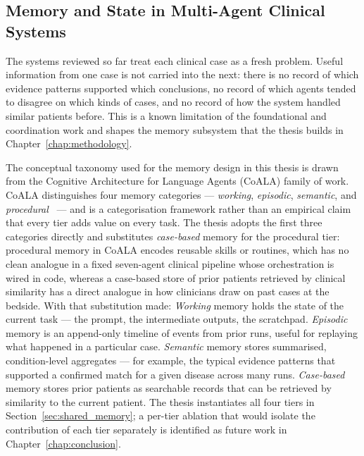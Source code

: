 \FloatBarrier
\subsection{Memory and State in Multi-Agent Clinical Systems}
\label{subsec:memory_state}

The systems reviewed so far treat each clinical case as a fresh problem.
Useful information from one case is not carried into the next: there is no
record of which evidence patterns supported which conclusions, no record of
which agents tended to disagree on which kinds of cases, and no record of how
the system handled similar patients before. This is a known limitation of the
foundational and coordination work and shapes the memory subsystem that the
thesis builds in Chapter~\ref{chap:methodology}.

The conceptual taxonomy used for the memory design in this thesis is drawn
from the Cognitive Architecture for Language Agents (CoALA) family of work.
CoALA distinguishes four memory categories --- \emph{working}, \emph{episodic},
\emph{semantic}, and \emph{procedural}~\cite{Sumers2024CoALA} --- and is a
categorisation framework rather than an empirical claim that every tier
adds value on every task. The thesis adopts the first three categories
directly and substitutes \emph{case-based} memory for the procedural tier:
procedural memory in CoALA encodes reusable skills or routines, which has no
clean analogue in a fixed seven-agent clinical pipeline whose orchestration
is wired in code, whereas a case-based store of prior patients retrieved by
clinical similarity has a direct analogue in how clinicians draw on past
cases at the bedside. With that substitution made: \emph{Working} memory
holds the state of the current task --- the prompt, the intermediate
outputs, the scratchpad. \emph{Episodic} memory is an append-only timeline
of events from prior runs, useful for replaying what happened in a
particular case. \emph{Semantic} memory stores summarised, condition-level
aggregates --- for example, the typical evidence patterns that supported a
confirmed match for a given disease across many runs. \emph{Case-based}
memory stores prior patients as searchable records that can be retrieved by
similarity to the current patient. The thesis instantiates all four tiers in
Section~\ref{sec:shared_memory}; a per-tier ablation that would isolate the
contribution of each tier separately is identified as future work in
Chapter~\ref{chap:conclusion}.

